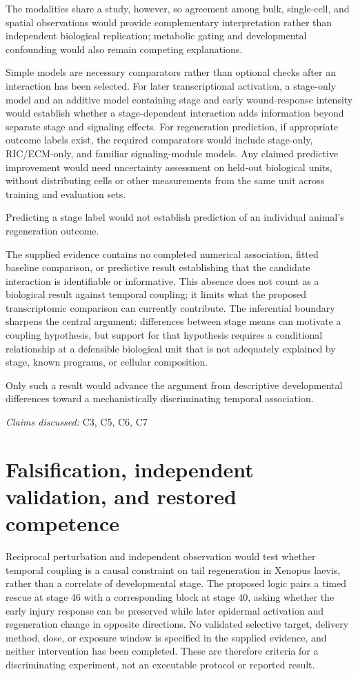 \documentclass[11pt]{article}
\begin{document}
The modalities share a study, however, so agreement among bulk, single-cell, and spatial observations would provide complementary interpretation rather than independent biological replication; metabolic gating and developmental confounding would also remain competing explanations.

Simple models are necessary comparators rather than optional checks after an interaction has been selected. For later transcriptional activation, a stage-only model and an additive model containing stage and early wound-response intensity would establish whether a stage-dependent interaction adds information beyond separate stage and signaling effects. For regeneration prediction, if appropriate outcome labels exist, the required comparators would include stage-only, RIC/ECM-only, and familiar signaling-module models. Any claimed predictive improvement would need uncertainty assessment on held-out biological units, without distributing cells or other measurements from the same unit across training and evaluation sets.

Predicting a stage label would not establish prediction of an individual animal’s regeneration outcome.

The supplied evidence contains no completed numerical association, fitted baseline comparison, or predictive result establishing that the candidate interaction is identifiable or informative. This absence does not count as a biological result against temporal coupling; it limits what the proposed transcriptomic comparison can currently contribute. The inferential boundary sharpens the central argument: differences between stage means can motivate a coupling hypothesis, but support for that hypothesis requires a conditional relationship at a defensible biological unit that is not adequately explained by stage, known programs, or cellular composition.

Only such a result would advance the argument from descriptive developmental differences toward a mechanistically discriminating temporal association.

\textit{Claims discussed: }C3, C5, C6, C7
\section{Falsification, independent validation, and restored competence}
Reciprocal perturbation and independent observation would test whether temporal coupling is a causal constraint on tail regeneration in Xenopus laevis, rather than a correlate of developmental stage. The proposed logic pairs a timed rescue at stage 46 with a corresponding block at stage 40, asking whether the early injury response can be preserved while later epidermal activation and regeneration change in opposite directions. No validated selective target, delivery method, dose, or exposure window is specified in the supplied evidence, and neither intervention has been completed. These are therefore criteria for a discriminating experiment, not an executable protocol or reported result.
\end{document}
